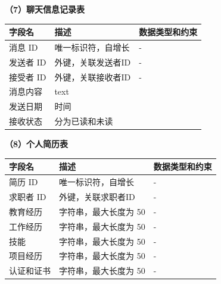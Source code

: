 \documentclass[UTF8,a4paper,10pt]{ctexart}
\begin{document}
\textbf{（7）聊天信息记录表}\\
\begin{center}
\begin{tabular}{|l|l|l|}
\hline
字段名 & 描述 & 数据类型和约束 \\
\hline
消息 ID& 唯一标识符，自增长 & - \\\hline
发送者 ID& 外键，关联发送者ID& - \\\hline
接受者 ID& 外键，关联接收者ID& - \\\hline
 消息内容& text&\\
\hline
 发送日期& 时间&\\\hline
 接收状态& 分为已读和未读&\\\hline
\end{tabular}
\end{center}

\textbf{（8）个人简历表}\\
\begin{center}
\begin{tabular}{|l|l|l|}
\hline
字段名 & 描述 & 数据类型和约束 \\
\hline
简历 ID& 唯一标识符，自增长 & - \\\hline
求职者 ID& 外键，关联求职者ID& - \\\hline
教育经历 & 字符串，最大长度为 50& - \\\hline
工作经历 & 字符串，最大长度为 50& - \\\hline
技能 & 字符串，最大长度为 50& - \\\hline
项目经历 & 字符串，最大长度为 50& - \\\hline
认证和证书& 字符串，最大长度为 50& - \\\hline
\end{tabular}
\end{center}
\end{document}
